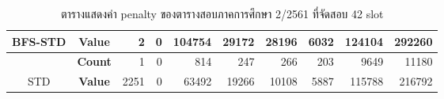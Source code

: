 \begin{table}[]
{\begin{tabular}{@{}ccrrrrrrrr@{}}
    \multirow{-2}{*}{BFS-STD}                    & \textbf{Value}                        & 2                           & 0                        & 104754                       & 29172                        & 28196                        & 6032                        & 124104                        & 292260                        \\ \midrule
    {\color[HTML]{FE0000} }                      & {\color[HTML]{FE0000} \textbf{Count}} & {\color[HTML]{FE0000} 1}    & {\color[HTML]{FE0000} 0} & {\color[HTML]{FE0000} 814}   & {\color[HTML]{FE0000} 247}   & {\color[HTML]{FE0000} 266}   & {\color[HTML]{FE0000} 203}  & {\color[HTML]{FE0000} 9649}   & {\color[HTML]{FE0000} 11180}  \\ \cmidrule(l){2-10} 
    \multirow{-2}{*}{{\color[HTML]{FE0000} STD}} & {\color[HTML]{FE0000} \textbf{Value}} & {\color[HTML]{FE0000} 2251} & {\color[HTML]{FE0000} 0} & {\color[HTML]{FE0000} 63492} & {\color[HTML]{FE0000} 19266} & {\color[HTML]{FE0000} 10108} & {\color[HTML]{FE0000} 5887} & {\color[HTML]{FE0000} 115788} & {\color[HTML]{FE0000} 216792} \\ \bottomrule
    \end{tabular}%
    }
    \caption{ตารางแสดงค่า penalty ของตารางสอบภาคการศึกษา 2/2561 ที่จัดสอบ 42 slot}
    \label{tab:result_table_261}
\end{table}
